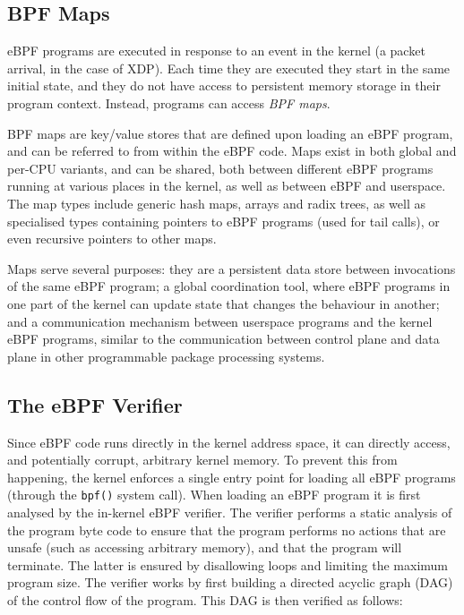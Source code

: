 \documentclass[sigconf]{acmart}
\begin{document}
\subsection{BPF Maps}
\label{sec:bpf-maps}
eBPF programs are executed in response to an event in the kernel (a packet
arrival, in the case of XDP). Each time they are executed they start in the same
initial state, and they do not have access to persistent memory storage in their
program context. Instead, programs can access \emph{BPF maps}.

BPF maps are key/value stores that are defined upon loading an eBPF program, and
can be referred to from within the eBPF code. Maps exist in both global and
per-CPU variants, and can be shared, both between different eBPF programs
running at various places in the kernel, as well as between eBPF and userspace.
The map types include generic hash maps, arrays and radix trees, as well as
specialised types containing pointers to eBPF programs (used for tail calls), or
even recursive pointers to other maps.

Maps serve several purposes: they are a persistent data store between
invocations of the same eBPF program; a global coordination tool, where eBPF
programs in one part of the kernel can update state that changes the behaviour
in another; and a communication mechanism between userspace programs and the
kernel eBPF programs, similar to the communication between control plane and
data plane in other programmable package processing systems.

\subsection{The eBPF Verifier}
\label{sec:bpf-verifier}
Since eBPF code runs directly in the kernel address space, it can directly
access, and potentially corrupt, arbitrary kernel memory. To prevent this from
happening, the kernel enforces a single entry point for loading all eBPF
programs (through the \texttt{bpf()} system call). When loading an eBPF program
it is first analysed by the in-kernel eBPF verifier. The verifier performs a
static analysis of the program byte code to ensure that the program performs no
actions that are unsafe (such as accessing arbitrary memory), and that the
program will terminate. The latter is ensured by disallowing loops and limiting
the maximum program size. The verifier works by first building a directed
acyclic graph (DAG) of the control flow of the program. This DAG is then
verified as follows:
\end{document}
